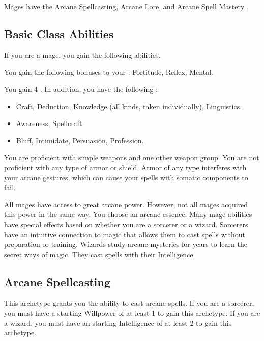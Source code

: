      Mages have the Arcane Spellcasting, Arcane Lore, and Arcane Spell Mastery .

    \subsection{Basic Class Abilities}
        If you are a mage, you gain the following abilities.

        You gain the following bonuses to your :  Fortitude,  Reflex,  Mental.

        You gain 4 .
        In addition, you have the following :
        \begin{itemize}
            \item {} Craft, Deduction, Knowledge (all kinds, taken individually), Linguistics.
            \item {} Awareness, Spellcraft.
            \item {} Bluff, Intimidate, Persuasion, Profession.
        \end{itemize}

        You are proficient with simple weapons and one other weapon group.
        You are not proficient with any type of armor or shield.
        Armor of any type interferes with your arcane gestures, which can cause your spells with somatic components to fail.

        All mages have access to great arcane power.
        However, not all mages acquired this power in the same way.
        You choose an arcane essence.
        Many mage abilities have special effects based on whether you are a sorcerer or a wizard.
         Sorcerers have an intuitive connection to magic that allows them to cast spells without preparation or training.
         Wizards study arcane mysteries for years to learn the secret ways of magic.
        They cast spells with their Intelligence.

    \subsection{Arcane Spellcasting}
        This archetype grants you the ability to cast arcane spells.
        If you are a sorcerer, you must have a starting Willpower of at least 1 to gain this archetype.
        If you are a wizard, you must have an starting Intelligence of at least 2 to gain this archetype.

